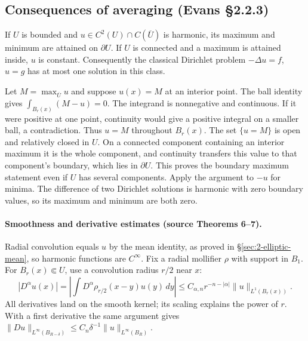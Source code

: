 

\subsection{Consequences of averaging (Evans \S2.2.3)}
\begin{theorem}
If $U$ is bounded and $u\in C^2(U)\cap C(\overline U)$ is harmonic,
its maximum and minimum are attained on $\partial U$.
If $U$ is connected and a maximum is attained inside, $u$ is constant.
Consequently the classical Dirichlet problem $-\Delta u=f$, $u=g$
has at most one solution in this class.
\end{theorem}
\begin{expandedproof}
Let $M=\max_{\overline U}u$ and suppose $u(x)=M$ at an interior point.
The ball identity gives $\int_{B_r(x)}(M-u)=0$.
The integrand is nonnegative and continuous. If it were positive at
one point, continuity would give a positive integral on a smaller ball,
a contradiction. Thus $u=M$ throughout $B_r(x)$.
The set $\{u=M\}$ is open and relatively closed in $U$.
On a connected component containing an interior maximum it is the
whole component, and continuity transfers this value to that component's
boundary, which lies in $\partial U$. This proves the boundary maximum
statement even if $U$ has several components.
Apply the argument to $-u$ for minima.
The difference of two Dirichlet solutions is harmonic with zero boundary
values, so its maximum and minimum are both zero.
\end{expandedproof}
\Needspace{45mm}

\paragraph{Smoothness and derivative estimates (source Theorems 6--7).}
Radial convolution equals $u$ by the mean identity, as proved in
\S\ref{sec:2-elliptic-mean}, so harmonic functions are $C^\infty$.
Fix a radial mollifier $\rho$ with support in $B_1$.
For $B_r(x)\Subset U$, use a convolution radius $r/2$ near $x$:
\[
 |D^\alpha u(x)|
 =\left|\int D^\alpha\rho_{r/2}(x-y)u(y)\,dy\right|
 \leq C_{\alpha,n}r^{-n-|\alpha|}\|u\|_{L^1(B_r(x))}.
 \tag{D}
\]
All derivatives land on the smooth kernel; its scaling explains the power
of $r$. With a first derivative the same argument gives
$\|Du\|_{L^\infty(B_{R-\delta})}
 \leq C_n\delta^{-1}\|u\|_{L^\infty(B_R)}$.

